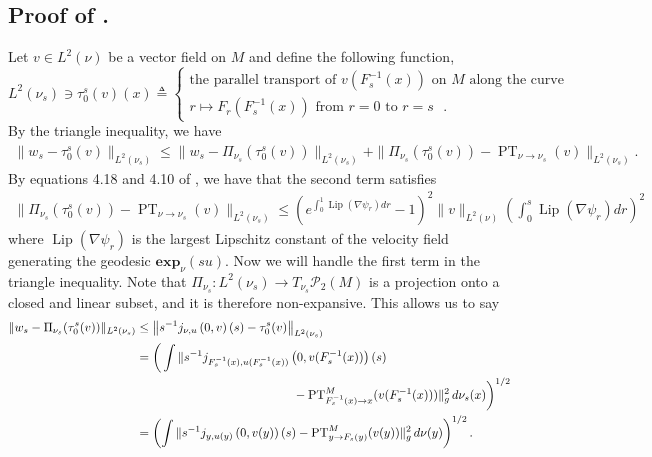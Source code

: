 \documentclass[11pt]{article}
\newcommand{\man}{M}
\newcommand{\PT}{\operatorname{PT}}
\begin{document}
\subsection{Proof of .} \label{sec: proof of one step parallel transport approx}
Let $v \in L^2(\nu)$ be a vector field on $M$ and define the following function, 
\begin{equation*}
    L^2(\nu_s) \ni \tau_0^s(v)(x) \triangleq \begin{cases}
        \text{the parallel transport of $v(F_s^{-1}(x))$ on $\man$ along the curve} \\
        r \mapsto F_r(F_s^{-1}(x)) \text{ from $r = 0$ to $r = s$ }.
    \end{cases}
\end{equation*}
By the triangle inequality, we have
\begin{align*}
    \|w_s - \tau_0^s(v)\|_{L^2(\nu_s)} \leq \|w_s - \Pi_{\nu_s}(\tau_0^s(v))\|_{L^2(\nu_s)} + \|\Pi_{\nu_s}(\tau_0^s(v)) - {\PT}_{\nu \rightarrow \nu_s}(v)\|_{L^2(\nu_s)}.
\end{align*}
By equations 4.18 and 4.10 of \citet{gigli2012second}, we have that the second term satisfies
\begin{align*}
    \|\Pi_{\nu_s}(\tau_0^s(v)) - {\PT}_{\nu \rightarrow \nu_s}(v)\|_{L^2(\nu_s)} \leq \left(e^{\int_0^1{\operatorname{Lip}}(\nabla \psi_r)dr} - 1\right)^2\|v\|_{L^2(\nu)}\left(\int_0^s{\operatorname{Lip}}(\nabla\psi_r)dr\right)^2
\end{align*}
where ${\operatorname{Lip}}(\nabla\psi_r)$ is the largest Lipschitz constant of the velocity field generating the geodesic $\mathbf{exp}_{\nu}(su).$ Now we will handle the first term in the triangle inequality. Note that $\Pi_{\nu_s}: L^2(\nu_s) \rightarrow T_{\nu_s}\mathcal{P}_{2}(\man)$ is a projection onto a closed and linear subset, and it is therefore non-expansive. This allows us to say
\begin{align*}
    \|w_s - \Pi_{\nu_s}(\tau_0^s(v))\|_{L^2(\nu_s)} &\leq \left\|s^{-1}j_{\nu, u}\left(0, v\right)(s)  - \tau_0^s(v) \right\|_{L^2(\nu_s)} \\
    &= \bigg(\int \|s^{-1}j_{F_s^{-1}(x), u(F^{-1}_s(x))}\left(0, v(F_s^{-1}(x))\right)(s) \\
    &\hspace{45mm}- {\PT}^\man_{F_s^{-1}(x) \rightarrow x}(v(F_s^{-1}(x))) \|_g^2 \,d\nu_s(x)\bigg)^{1/2} \\
    &= \left(\int \|s^{-1}j_{y, u(y)}\left(0, v(y)\right)(s)  - {\PT}^\man_{y \rightarrow F_s(y)}(v(y)) \|_g^2 \,d\nu(y)\right)^{1/2}.
\end{align*}
\end{document}
